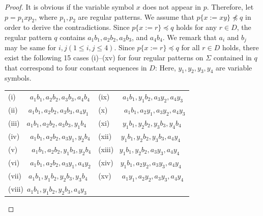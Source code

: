 \begin{proof}
It is obvious if the variable symbol $x$ does not appear in $p$.
Therefore, let $p=p_{1}xp_{2}$, where $p_{1}, p_{2}$ are regular patterns.
We assume that $p \{ x := xy \} \not \preceq q$ in order to derive the contradictions.
Since $p \{ x := r \} \preceq q$ holds for any $r \in D$,
the regular pattern $q$ contains $a_{1}b_{1}, a_{2}b_{2}, a_{3}b_{3}$, and $a_{4}b_{4}$.
We remark that $a_i$ and $b_j$ may be same for $i,j (1\le i,j\le 4)$.
Since $p \{ x := r \} \preceq q$ for all $r \in D$ holds, 
there exist the following 15 cases (i)--(xv) for four regular patterns on $\Sigma$ contained in $q$ that correspond to four constant sequences in $D$:
Here, $y_1,y_2,y_3,y_4$ are variable symbols.

\medskip  
\noindent
\begin{tabular}{ll}
(i)~~~~$a_{1}b_{1}, a_{2}b_{2}, a_{3}b_{3}, a_{4}b_{4}$  & (ix)~~~ $a_{1}b_{1}, y_{1}b_{2}, a_{3}y_{2}, a_{4}y_{3}$ \\
(ii)~~~$a_{1}b_{1}, a_{2}b_{2}, a_{3}b_{3}, a_{4}y_{1}$  & (x)~~~~ $a_{1}b_{1}, a_{2}y_{1}, a_{3}y_{2}, a_{4}y_{3}$ \\
(iii)~~$a_{1}b_{1}, a_{2}b_{2}, a_{3}b_{3}, y_{1}b_{4}$ & (xi)~~~ $y_{1}b_{1}, y_{2}b_{2}, y_{3}b_{3}, y_{4}b_{4}$ \\
(iv)~~~$a_{1}b_{1}, a_{2}b_{2}, a_{3}y_{1}, y_{2}b_{4}$  & (xii)~~ $y_{1}b_{1}, y_{2}b_{2}, y_{3}b_{3}, a_{4}y_{4}$ \\
(v)~~~~$a_{1}b_{1}, a_{2}b_{2}, y_{1}b_{3}, y_{2}b_{4}$    & (xiii)~ $y_{1}b_{1}, y_{2}b_{2}, a_{3}y_{3}, a_{4}y_{4}$ \\
(vi)~~~$a_{1}b_{1}, a_{2}b_{2}, a_{3}y_{1}, a_{4}y_{2}$   & (xiv)~~$y_{1}b_{1}, a_{2}y_{2}, a_{3}y_{3}, a_{4}y_{4}$ \\
(vii)~~$a_{1}b_{1}, y_{1}b_{2}, y_{2}b_{3}, y_{3}b_{4}$  & (xv)~~~$a_{1}y_{1}, a_{2}y_{2}, a_{3}y_{3}, a_{4}y_{4}$ \\
(viii)~$a_{1}b_{1}, y_{1}b_{2}, y_{2}b_{3}, a_{4}y_{3}$ &        %
\end{tabular}
\medskip


\end{proof}
